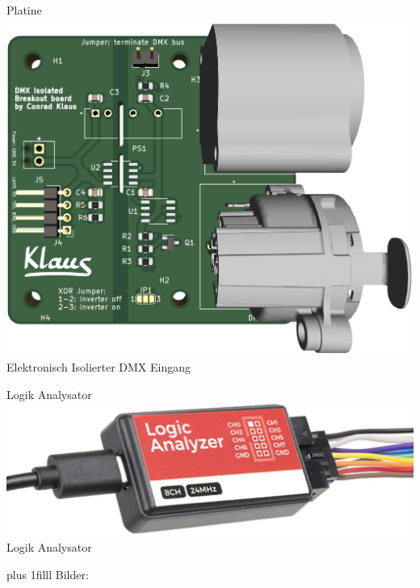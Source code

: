 \documentclass[Nike]{tuberlinbeamer}
\newcommand{\customcite}[1]{
	\vskip0pt plus 1filll
	\color{grau}
	\raggedleft \tiny Bilder: \cite{#1}
}
\begin{document}
\begin{frame}{Platine}
		\centering
	\includegraphics[height=\textheight - 25pt]{pictures/pcbDmxBreakout3dView.png}\\
	Elektronisch Isolierter DMX Eingang
\end{frame}

\begin{frame}{Logik Analysator}
	\centering
	\includegraphics[width=\textwidth - 25pt]{pictures/usb-logic-analyzer-side}\\
	Logik Analysator
	\customcite{fragen}
\end{frame}
\end{document}

